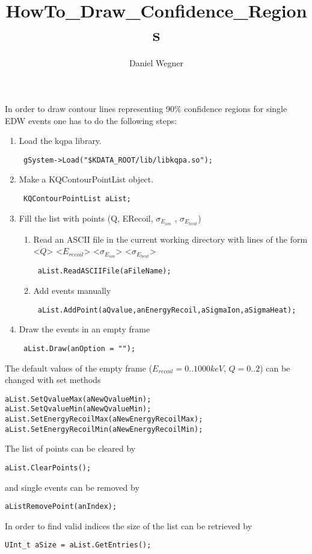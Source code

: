 \documentclass[10pt, a4paper]{article}
\title{HowTo_Draw_Confidence_Regions}
\author{Daniel Wegner}
\begin{document}
In order to draw contour lines representing 90\% confidence regions for single EDW events one has to do the following steps:

\begin{enumerate}
\item Load the kqpa library.
\begin{verbatim} gSystem->Load("$KDATA_ROOT/lib/libkqpa.so"); \end{verbatim}
\item Make a KQContourPointList object.
\begin{verbatim} KQContourPointList aList; \end{verbatim}
\item Fill the list with points (Q, ERecoil, $\sigma_{E_{ion}}$ , $\sigma_{E_{heat}}$)
\begin{enumerate}
\item Read an ASCII file in the current working directory with lines of the form <$Q$> <$E_{recoil}$> <$\sigma_{E_{ion}}$> <$\sigma_{E_{heat}}$> 
\begin{verbatim} aList.ReadASCIIFile(aFileName); \end{verbatim}
\item Add events manually
\begin{verbatim} aList.AddPoint(aQvalue,anEnergyRecoil,aSigmaIon,aSigmaHeat); \end{verbatim}
\end{enumerate}
\item Draw the events in an empty frame
\begin{verbatim} aList.Draw(anOption = ""); \end{verbatim}
\end{enumerate}

The default values of the empty frame ($E_{recoil} = 0..1000 keV$, $Q = 0..2$) can be changed with set methods
\begin{verbatim}
aList.SetQvalueMax(aNewQvalueMin);
aList.SetQvalueMin(aNewQvalueMin);
aList.SetEnergyRecoilMax(aNewEnergyRecoilMax);
aList.SetEnergyRecoilMin(aNewEnergyRecoilMin);
\end{verbatim}

The list of points can be cleared by
\begin{verbatim}
aList.ClearPoints();
\end{verbatim}
and single events can be removed by
\begin{verbatim}
aListRemovePoint(anIndex);
\end{verbatim}
In order to find valid indices the size of the list can be retrieved by
\begin{verbatim}
UInt_t aSize = aList.GetEntries();
\end{verbatim}
\end{document}
